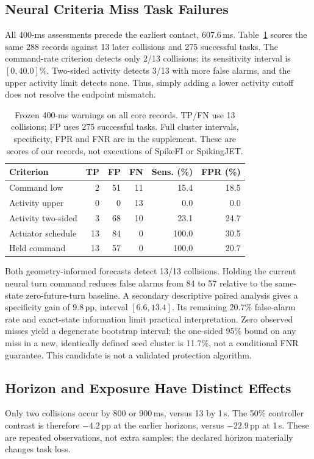 \subsection{Neural Criteria Miss Task Failures}
All 400-ms assessments precede the earliest contact, 607.6\,ms. Table~\ref{tab:v9-warnings} scores the same 288 records against 13 later collisions and 275 successful tasks. The command-rate criterion detects only 2/13 collisions; its sensitivity interval is $[0,40.0]\%$. Two-sided activity detects 3/13 with more false alarms, and the upper activity limit detects none. Thus, simply adding a lower activity cutoff does not resolve the endpoint mismatch.

\begin{table}[t]
\caption{Frozen 400-ms warnings on all core records. TP/FN use 13 collisions; FP uses 275 successful tasks. Full cluster intervals, specificity, FPR and FNR are in the supplement. These are scores of our records, not executions of SpikeFI or SpikingJET.}
\label{tab:v9-warnings}
\centering
\begin{tabular}{lrrrrr}
\toprule
Criterion & TP & FP & FN & Sens. (\%) & FPR (\%)\\
\midrule
Command low & 2 & 51 & 11 & 15.4 & 18.5\\
Activity upper & 0 & 0 & 13 & 0.0 & 0.0\\
Activity two-sided & 3 & 68 & 10 & 23.1 & 24.7\\
Actuator schedule & 13 & 84 & 0 & 100.0 & 30.5\\
Held command & 13 & 57 & 0 & 100.0 & 20.7\\
\bottomrule
\end{tabular}
\end{table}

Both geometry-informed forecasts detect 13/13 collisions. Holding the current neural turn command reduces false alarms from 84 to 57 relative to the same-state zero-future-turn baseline. A secondary descriptive paired analysis gives a specificity gain of 9.8\,pp, interval $[6.6,13.4]$. Its remaining 20.7\% false-alarm rate and exact-state information limit practical interpretation. Zero observed misses yield a degenerate bootstrap interval; the one-sided 95\% bound on any miss in a new, identically defined seed cluster is 11.7\%, not a conditional FNR guarantee. This candidate is not a validated protection algorithm.

\subsection{Horizon and Exposure Have Distinct Effects}
Only two collisions occur by 800 or 900\,ms, versus 13 by 1\,s. The 50\% controller contrast is therefore $-4.2$\,pp at the earlier horizons, versus $-22.9$\,pp at 1\,s. These are repeated observations, not extra samples; the declared horizon materially changes task loss.

